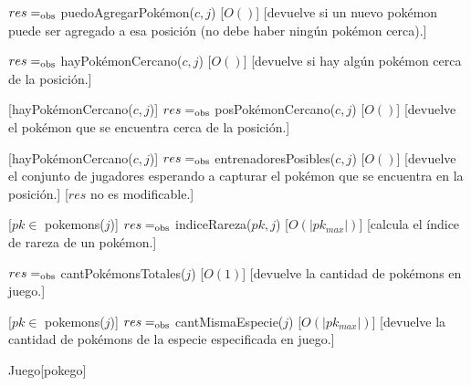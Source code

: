 \begin{Interfaz}
	{$res =_{\mathrm{obs}}$ puedoAgregarPokémon($c,j$)}
	[$O()$]
	[devuelve si un nuevo pokémon puede ser agregado a esa posición (no debe haber ningún pokémon cerca).]

	{$res =_{\mathrm{obs}}$ hayPokémonCercano($c,j$)}
	[$O()$]
	[devuelve si hay algún pokémon cerca de la posición.]

	[hayPokémonCercano($c,j$)]
	{$res =_{\mathrm{obs}}$ posPokémonCercano($c,j$)}
	[$O()$]
	[devuelve el pokémon que se encuentra cerca de la posición.]

	[hayPokémonCercano($c,j$)]
	{$res =_{\mathrm{obs}}$ entrenadoresPosibles($c,j$)}
	[$O()$]
	[devuelve el conjunto de jugadores esperando a capturar el pokémon que se encuentra en la posición.]
	[$res$ no es modificable.]

	[$pk \in$ pokemons($j$)]
	{$res =_{\mathrm{obs}}$ indiceRareza($pk,j$)}
	[$O(|pk_{max}|)$]
	[calcula el índice de rareza de un pokémon.]

	{$res =_{\mathrm{obs}}$ cantPokémonsTotales($j$)}
	[$O(1)$]
	[devuelve la cantidad de pokémons en juego.]

	[$pk \in$ pokemons($j$)]
	{$res =_{\mathrm{obs}}$ cantMismaEspecie($j$)}
	[$O(|pk_{max}|)$]
	[devuelve la cantidad de pokémons de la especie especificada en juego.]

\end{Interfaz}

\begin{Representacion}

	\begin{Estructura}{Juego}[pokego]
		\begin{Tupla}[pokego]
		\end{Tupla}

		\begin{Tupla}[infoJugador]
		\end{Tupla}

	\end{Estructura}

\end{Representacion}


\begin{Algoritmos}


\end{Algoritmos}